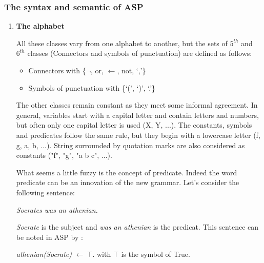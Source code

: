 \subsubsection{The syntax and semantic of ASP}
\label{sectionSyntaxeASP}
\begin{enumerate}
\item \textbf{The alphabet}

All these classes vary from one alphabet to another, but the sets of $ 5^{th} $ and $ 6^{th} $ classes (Connectors and symbols of punctuation) are defined as follows:
\begin{itemize}
  \item Connectors with \{$\neg$, or, $\leftarrow$, not, ‘,’\}
  \item Symbols of punctuation with \{‘(’, ‘)’, ‘.’\}
\end{itemize}


The other classes remain constant as they meet some informal agreement. In general, variables start with a capital letter and contain letters and numbers, but often only one capital letter is used (\eg X, Y, ...).
The constants, symbols and predicates follow the same rule, but they begin with a lowercase letter (\eg f, g, a, b, ...).
String surrounded by quotation marks are also considered as constants (\eg "f", "g", "a b c", ...).

What seems a little fuzzy is the concept of predicate. Indeed the word predicate can be an innovation of the new grammar. Let's consider the following sentence: 
\begin{tabbing}
 \textit{Socrates was an athenian.} 
\end{tabbing}
\textit{Socrate} is the subject and \textit{was an athenian} is the predicat. This sentence can be noted in ASP by :
\begin{tabbing}
 \textit{athenian(Socrate) }$\leftarrow ~ \top$. \hspace{2cm} with $\top$ is the symbol of True.
\end{tabbing} 


\end{enumerate}

